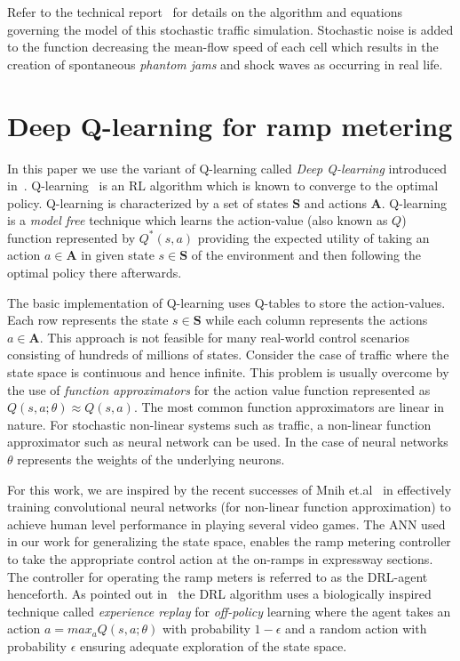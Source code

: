 \documentclass[conference]{IEEEtran}
\begin{document}
Refer to the technical report~\cite{sunderrajan2016symbiotic} for details on the algorithm and equations governing the model of this stochastic traffic simulation. Stochastic noise is added to the function decreasing the mean-flow speed of each cell which results in the creation of spontaneous {\it phantom jams} and shock waves as occurring in real life.





\section{Deep Q-learning for ramp metering}
\label{sec:deep-ql}

In this paper we use the variant of Q-learning called {\it Deep Q-learning} introduced in~\cite{mnih2015human}. Q-learning~\cite{sutton1998reinforcement} is an RL algorithm which is known to converge to the optimal policy. Q-learning is characterized by a set of states $\mathbf{S}$ and actions $\mathbf{A}$.  Q-learning is a {\it model free} technique which learns the action-value (also known as $Q$) function represented by $Q^*(s,a)$ providing the expected utility of taking an action $a\in \mathbf{A}$ in given state $s \in \mathbf{S}$ of the environment and then following the optimal policy there afterwards. 

The basic implementation of Q-learning uses Q-tables to store the action-values. Each row represents the state $s \in \mathbf{S}$ while each column represents the actions $a \in \mathbf{A}$. This approach is not feasible for many real-world control scenarios consisting of hundreds of millions of states. Consider the case of traffic where the state space is continuous and hence infinite. This problem is usually overcome by the use of {\it function approximators} for the action value function represented as $Q(s,a;\theta) \approx Q(s,a)$. The most common function approximators are linear in nature. For stochastic non-linear systems such as traffic, a non-linear function approximator such as neural network can be used. In the case of neural networks $\theta$ represents the weights of the underlying neurons.

For this work, we are inspired by the recent successes of Mnih et.al~\cite{mnih2015human} in effectively training convolutional neural networks (for non-linear function approximation) to achieve human level performance in playing several video games. The \ac{ANN} used in our work for generalizing the state space, enables the ramp metering controller to take the appropriate control action at the on-ramps in expressway sections. The controller for operating the ramp meters is referred to as the DRL-agent henceforth. As pointed out in~\cite{mnih2015human} the \ac{DRL} algorithm uses a biologically inspired technique called {\it experience replay} for {\it off-policy} learning where the agent takes an action $a=max_{a}Q(s,a;\theta)$ with probability $1-\epsilon$ and a random action with probability $\epsilon$ ensuring adequate exploration of the state space.  
\end{document}
